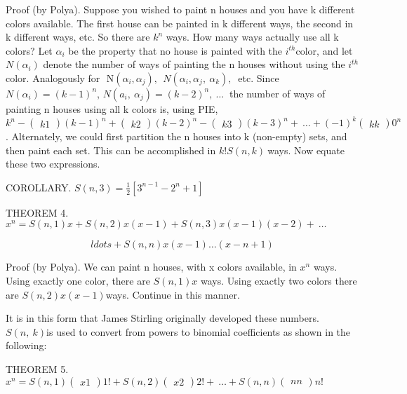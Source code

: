 \documentclass[10pt,letter]{article}
\begin{document}
Proof (by Polya). Suppose you wished to paint n houses and you have k
different colors available. The first house can be painted in k
different ways, the second in k different ways, etc. So there are
\(k^{n}\) ways. How many ways actually use all k colors? Let
\(\alpha_{i}\) be the property that no house is painted with the
\(i^{th}\)color, and let \(N(\alpha_{i})\) denote the number of ways of
painting the n houses without using the \(i^{th}\)color. Analogously for
\(\text{\ N}\left( \alpha_{i},\alpha_{j} \right),\ \ N\left( \alpha_{i},\alpha_{j},\ \alpha_{k} \right),\ \)
etc. Since \(N\left( \alpha_{i} \right) = \left( k - 1 \right)^{n}\),
\(N\left( a_{i},\ \alpha_{j} \right) = \left( k - 2 \right)^{n},\ \ldots\ \)
the number of ways of painting n houses using all k colors is, using
PIE, \(k^{n} -\begin{pmatrix}
k
1
\end{pmatrix}
\left( k - 1 \right)^{n} +
\begin{pmatrix}
k
2
\end{pmatrix}
\left( k - 2 \right)^{n} -
\begin{pmatrix}
k
3
\end{pmatrix}
\left( k - 3 \right)^{n} + \ \ldots + \left( - 1 \right)^{k}
\begin{pmatrix}
k
k
\end{pmatrix}
0^{n}\). Alternately, we could first partition the n houses
into k (non-empty) sets, and then paint each set. This can be
accomplished in \(k!S\left( n,k \right)\ \)ways. Now equate these two
expressions.

COROLLARY.
\(S\left( n,3 \right) = \frac{1}{2}\left\lbrack 3^{n - 1} - 2^{n} + 1 \right\rbrack\)

THEOREM 4.
\(x^{n} = S\left( n,1 \right)x + S\left( n,2 \right)x\left( x - 1 \right) + S\left( n,3 \right)x\left( x - 1 \right)\left( x - 2 \right) + \ \ldots\ \)

\[
ldots + S\left( n,n \right)x\left( x - 1 \right)\ldots(x - n + 1)
\]

Proof (by Polya). We can paint n houses, with x colors available, in
\(x^{n}\) ways. Using exactly one color, there are
\(S\left( n,1 \right)x\) ways. Using exactly two colors there are
\(S\left( n,2 \right)x(x - 1)\)ways. Continue in this manner.

It is in this form that James Stirling originally developed these
numbers. \(S(n,\ k)\)is used to convert from powers to binomial
coefficients as shown in the following:

THEOREM 5. \(x^{n} = S\left( n,1 \right)
\begin{pmatrix}
x
1
\end{pmatrix}
1! + S\left( n,2 \right)
\begin{pmatrix}
x
2
\end{pmatrix}
2! + \ \ldots + S\left( n,n \right)
\begin{pmatrix}
n
n
\end{pmatrix}
n!\ \)
\end{document}
